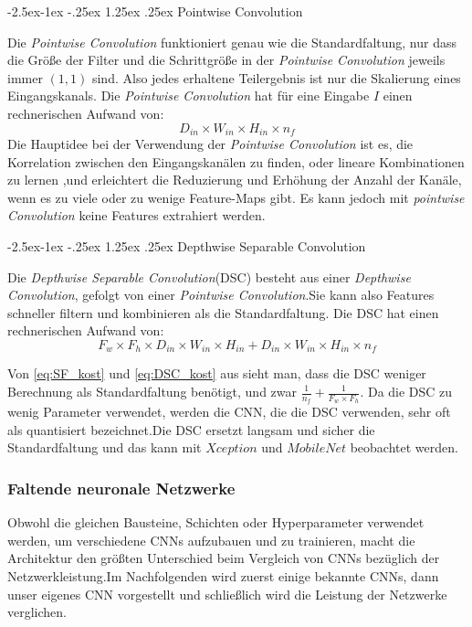 \documentclass[12pt,a4paper]{scrartcl}
\makeatletter
\numberwithin{equation}{section}
\renewcommand\paragraph{\@startsection{paragraph}{4}{\z@}%
	{-2.5ex\@plus -1ex \@minus -.25ex}%
	{1.25ex \@plus .25ex}%
	{\normalfont\normalsize\bfseries}}
\makeatother
\begin{document}
\paragraph{Pointwise Convolution}\label{Pointwise}

Die \textit{Pointwise Convolution} funktioniert genau wie die Standardfaltung, nur dass die Größe der Filter und die Schrittgröße in der \textit{Pointwise Convolution} jeweils immer $ (1,1) $ sind. Also jedes erhaltene Teilergebnis ist nur die Skalierung eines Eingangskanals. Die \textit{Pointwise Convolution} hat für eine Eingabe $ I $ einen rechnerischen Aufwand von:
\begin{equation}\label{eq:PT_kost}
	 D_{in}\times W_{in}\times H_{in} \times n_f
\end{equation}
Die Hauptidee bei der Verwendung der \textit{Pointwise Convolution} ist es, die Korrelation zwischen den Eingangskanälen zu finden, oder lineare Kombinationen zu lernen ,und erleichtert die Reduzierung und Erhöhung der Anzahl der Kanäle, wenn es zu viele oder zu wenige Feature-Maps gibt. Es kann jedoch mit \textit{pointwise Convolution} keine Features extrahiert werden.

\paragraph{Depthwise Separable Convolution} \label{DSC}

Die \textit{Depthwise Separable Convolution}(DSC) besteht aus einer \textit{Depthwise Convolution}, gefolgt von einer \textit{Pointwise Convolution}.Sie kann also Features schneller filtern und kombinieren als die Standardfaltung. Die DSC hat einen rechnerischen Aufwand von:
\begin{equation}\label{eq:DSC_kost}
F_w\times F_h \times D_{in}\times W_{in}\times H_{in} + D_{in}\times W_{in}\times H_{in} \times n_f
\end{equation}

Von \ref{eq:SF_kost} und \ref{eq:DSC_kost} aus sieht man, dass die DSC weniger Berechnung als Standardfaltung benötigt, und zwar $ \frac{1}{n_f} + \frac{1}{F_w\times F_h}$. Da die DSC zu wenig Parameter verwendet, werden die \ac{CNN}, die die DSC verwenden, sehr oft als quantisiert bezeichnet.Die DSC ersetzt langsam und sicher die Standardfaltung und das kann mit $ Xception $ und $ MobileNet $ beobachtet werden.

\subsubsection{Faltende neuronale Netzwerke}\label{CNN}
Obwohl die gleichen Bausteine, Schichten oder Hyperparameter verwendet werden, um verschiedene \acsp{CNN} aufzubauen und zu trainieren, macht die Architektur den größten Unterschied beim Vergleich von \acsp{CNN} bezüglich der Netzwerkleistung.Im Nachfolgenden wird zuerst einige bekannte \acsp{CNN}, dann unser eigenes \ac{CNN} vorgestellt und schließlich wird die Leistung der Netzwerke verglichen.
\end{document}

